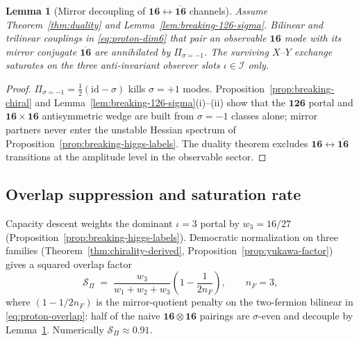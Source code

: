 \documentclass[aps,prd,onecolumn,amsmath,amssymb,nofootinbib,11pt]{revtex4-2}
\numberwithin{equation}{section}
\theoremstyle{plain}
\newtheorem{lemma}[theorem]{Lemma}
\theoremstyle{definition}
\theoremstyle{remark}
\begin{document}
\begin{lemma}[Mirror decoupling of $\mathbf{16}\leftrightarrow\overline{\mathbf{16}}$
channels]\label{lem:proton-mirror}
Assume Theorem~\ref{thm:duality} and Lemma~\ref{lem:breaking-126-sigma}.
Bilinear and trilinear couplings in \eqref{eq:proton-dim6} that pair an
observable $\mathbf{16}$ mode with its mirror conjugate
$\overline{\mathbf{16}}$ are annihilated by $\Pi_{\sigma=-1}$. The surviving
$X$--$Y$ exchange saturates on the three anti-invariant observer slots
$\iota\in\mathcal{I}$ only.
\end{lemma}

\begin{proof}
$\Pi_{\sigma=-1}=\tfrac12(\mathrm{id}-\sigma)$ kills $\sigma=+1$ modes.
Proposition~\ref{prop:breaking-chiral} and
Lemma~\ref{lem:breaking-126-sigma}(i)--(ii) show that the $\mathbf{126}$
portal and $\mathbf{16}\times\mathbf{16}$ antisymmetric wedge are built from
$\sigma=-1$ classes alone; mirror partners never enter the unstable Hessian
spectrum of Proposition~\ref{prop:breaking-higgs-labels}. The duality theorem
excludes $\mathbf{16}\leftrightarrow\overline{\mathbf{16}}$ transitions at the
amplitude level in the observable sector.
\end{proof}

\subsection{Overlap suppression and saturation rate}
\label{sec:proton-decay:saturation}

Capacity descent weights the dominant $\iota=3$ portal by
$w_3=16/27$ (Proposition~\ref{prop:breaking-higgs-labels}). Democratic
normalization on three families (Theorem~\ref{thm:chirality-derived},
Proposition~\ref{prop:yukawa-factor}) gives a squared overlap factor
\begin{equation}\label{eq:proton-SPi}
  \mathcal{S}_\Pi
  \;=\;
  \frac{w_3}{w_1+w_2+w_3}
  \left(1-\frac{1}{2n_F}\right),
  \qquad
  n_F=3,
\end{equation}
where $(1-1/2n_F)$ is the mirror-quotient penalty on the two-fermion bilinear
in \eqref{eq:proton-overlap}: half of the naive $\mathbf{16}\otimes\mathbf{16}$
pairings are $\sigma$-even and decouple by Lemma~\ref{lem:proton-mirror}.
Numerically $\mathcal{S}_\Pi\approx 0.91$.
\end{document}

